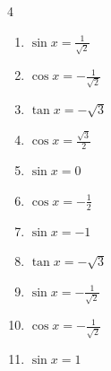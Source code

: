 \begin{multicols}{4}
\begin{enumerate}

  \item $\displaystyle \sin{x}  = \frac{1}{\sqrt{2}}$


  \item $\displaystyle \cos{x}  = -\frac{1}{\sqrt{2}}$


  \item $\displaystyle \tan{x}  = -\sqrt{3}$


  \item $\displaystyle \cos{x}  = \frac{\sqrt{3}}{2}$


  \item $\displaystyle \sin{x}  = 0$


  \item $\displaystyle \cos{x}  = -\frac{1}{2}$


  \item $\displaystyle \sin{x}  = -1$


  \item $\displaystyle \tan{x}  = -\sqrt{3}$


\columnbreak %

  \item $\displaystyle \sin{x}  = -\frac{1}{\sqrt{2}}$


  \item $\displaystyle \cos{x}  = -\frac{1}{\sqrt{2}}$


  \item $\displaystyle \sin{x}  = 1$



\end{enumerate}
\end{multicols}
